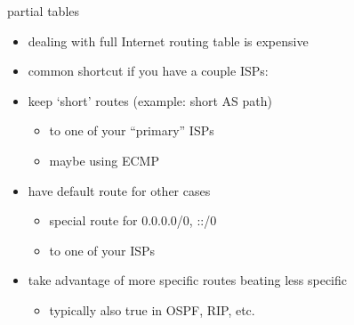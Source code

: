 \begin{frame}{partial tables}
    \begin{itemize}
    \item dealing with full Internet routing table is expensive
    \vspace{.5cm}
    \item common shortcut if you have a couple ISPs:
    \item keep `short' routes (example: short AS path)
        \begin{itemize}
        \item to one of your ``primary'' ISPs
        \item maybe using ECMP
        \end{itemize}
    \item have default route for other cases
        \begin{itemize}
        \item special route for 0.0.0.0/0, ::/0
        \item to one of your ISPs
        \end{itemize}
    \item take advantage of more specific routes beating less specific
        \begin{itemize}
        \item typically also true in OSPF, RIP, etc.
        \end{itemize}
    \end{itemize}
\end{frame}


